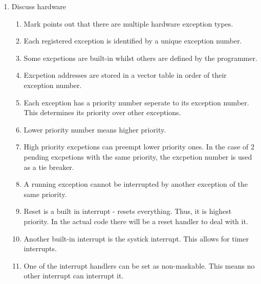 \documentclass[11pt,a4paper]{scrartcl}
\begin{document}
\begin{enumerate}
\item Discuss hardware
\begin{enumerate}
    \subsection{Exception Model}
        \item Mark points out that there are multiple hardware exception types.
        \item Each registered exception is identified by a unique exception number.
        \item Some excpetions are built-in whilst others are defined by the programmer.
        \item Excpetion addresses are stored in a vector table in order of their exception number.
        \item Each exception has a priority number seperate to its exception number. This determines its priority over other exceptions.
        \item Lower priority number means higher priority.
        \item High priority excpetions can preempt lower priority ones. In the case of 2 pending excpetions with the same priority, the excpetion number is used as a tie breaker.
        \item A running exception cannot be interrupted by another exception of the same priority.
        \item Reset is a built in interrupt - resets everything. Thus, it is highest priority. In the actual code there will be a reset handler to deal with it.
        \item Another built-in interrupt is the systick interrupt. This allows for timer interrupts.
        \item One of the interrupt handlers can be set as non-maskable. This means no other interrupt can interrupt it.
    \end{enumerate}


\end{enumerate}
\end{document}
